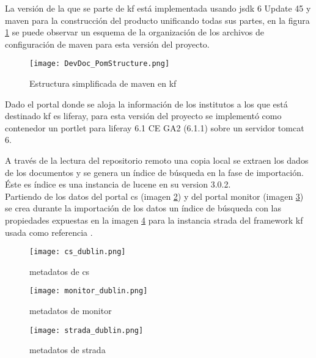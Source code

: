 La versión de la que se parte de \gls{kf} está implementada usando \Gls{jsdk} 6 Update 45 y \gls{maven} para la construcción del producto unificando todas sus partes, en la figura \ref{image:mavenkf} se puede observar un esquema de la organización de los archivos de configuración de \gls{maven} para esta versión del proyecto.\\

\begin{figure}[H]
  \centering
    \texttt{[image: DevDoc\_PomStructure.png]}
  \caption{Estructura simplificada de \gls{maven} en \gls{kf}}
  \label{image:mavenkf}
\end{figure}

Dado el portal donde se aloja la información de los institutos a los que está destinado \gls{kf} es \gls{liferay}, para esta versión del proyecto se implementó como contenedor un \gls{portlet} para \gls{liferay} 6.1 CE GA2 (6.1.1) sobre un servidor \gls{tomcat} 6.

A través de la lectura del repositorio remoto una copia local se extraen los dados de los documentos y se genera un índice de búsqueda en la fase de importación. Éste es índice es una instancia de \gls{lucene} en su version 3.0.2.\\

Partiendo de los datos del portal \gls{cs} (imagen \ref{image:csdata}) y del portal \gls{monitor} (imagen \ref{image:modata}) se crea durante la importación de los datos un índice de búsqueda con las propiedades expuestas en la imagen \ref{image:stradadata} para la instancia \gls{strada} del \gls{framework} \gls{kf} usada como referencia \cite{dublinstrada}.


\begin{figure}[H]
  \centering
    \texttt{[image: cs\_dublin.png]} 
  \caption{\Glspl{metadato} de \gls{cs} \cite{dublinstrada}}
  \label{image:csdata}
\end{figure}

\begin{figure}[H]
  \centering
    \texttt{[image: monitor\_dublin.png]} 
  \caption{\Glspl{metadato} de \gls{monitor} \cite{dublinstrada}}
  \label{image:modata}
\end{figure}

\begin{figure}[H]
  \centering
    \texttt{[image: strada\_dublin.png]} 
  \caption{\Glspl{metadato} de \gls{strada} \cite{dublinstrada}}
  \label{image:stradadata}
\end{figure}

